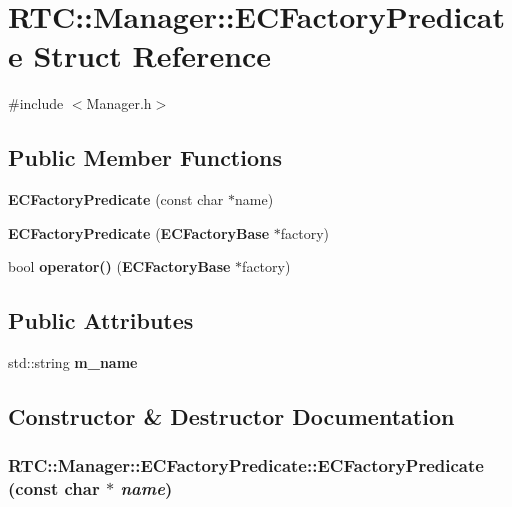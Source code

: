 \section{RTC::Manager::ECFactoryPredicate Struct Reference}
\label{structRTC_1_1Manager_1_1ECFactoryPredicate}


{\ttfamily \#include $<$Manager.h$>$}

\subsection*{Public Member Functions}
\begin{DoxyCompactItemize}
\item 
{\bf ECFactoryPredicate} (const char $\ast$name)
\item 
{\bf ECFactoryPredicate} ({\bf ECFactoryBase} $\ast$factory)
\item 
bool {\bf operator()} ({\bf ECFactoryBase} $\ast$factory)
\end{DoxyCompactItemize}
\subsection*{Public Attributes}
\begin{DoxyCompactItemize}
\item 
std::string {\bf m\_\-name}
\end{DoxyCompactItemize}


\subsection{Constructor \& Destructor Documentation}
\subsubsection[{ECFactoryPredicate}]{\setlength{\rightskip}{0pt plus 5cm}RTC::Manager::ECFactoryPredicate::ECFactoryPredicate (const char $\ast$ {\em name})\hspace{0.3cm}{\ttfamily  [inline]}}\label{structRTC_1_1Manager_1_1ECFactoryPredicate_acb95e8e1a216995c855c71cf7434e1b5}
